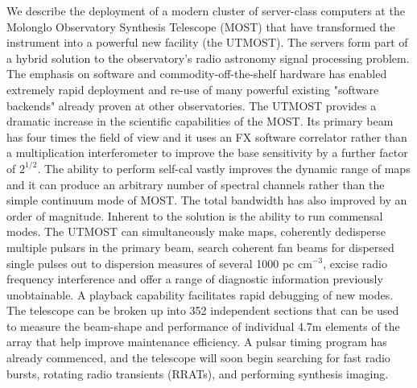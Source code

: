 We describe the deployment of a modern cluster of server-class computers at the Molonglo Observatory Synthesis Telescope (MOST) that have transformed the instrument into a powerful new facility (the UTMOST). The servers form part of a hybrid solution to the observatory's radio astronomy signal processing problem. The emphasis on software and commodity-off-the-shelf hardware has enabled extremely rapid deployment and re-use of many powerful existing "software backends" already proven at other observatories. The UTMOST provides a dramatic increase in the scientific capabilities of the MOST. Its primary beam has four times the field of view and it uses an FX software correlator rather than a multiplication interferometer to improve the base sensitivity by a further factor of $2^{1/2}$. The ability to perform self-cal vastly improves the dynamic range of maps and it can produce an arbitrary number of spectral channels rather than the simple continuum mode of MOST. The total bandwidth has also improved by an order of magnitude. Inherent to the solution is the ability to run commensal modes. The UTMOST can simultaneously make maps, coherently dedisperse multiple pulsars in the primary beam, search coherent fan beams for dispersed single pulses out to dispersion measures of several 1000 pc cm$^{-3}$, excise radio frequency interference and offer a range of diagnostic information previously unobtainable. A playback capability facilitates rapid debugging of new modes. The telescope can be broken up into 352 independent sections that can be used to measure the beam-shape and performance of individual 4.7m elements of the array that help improve maintenance efficiency. A pulsar timing program has already commenced, and the telescope will soon begin searching for fast radio bursts, rotating radio transients (RRATs), and performing synthesis imaging. 
